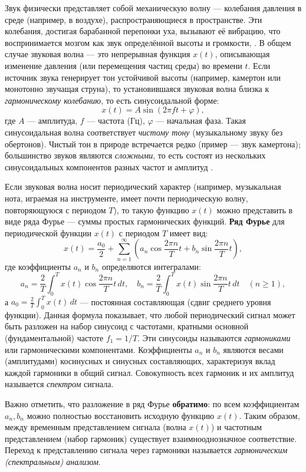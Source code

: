 \documentclass[bachelor, och, diploma]{SCWorks}
\begin{document}
Звук физически представляет собой механическую волну --- колебания давления в среде (например, в воздухе), распространяющиеся в пространстве. Эти колебания, достигая барабанной перепонки уха, вызывают её вибрацию, что воспринимается мозгом как звук определённой высоты и громкости\cite{fletcher}, \cite{rossing}. В общем случае звуковая волна --- это непрерывная функция $x(t)$, описывающая изменение давления (или перемещения частиц среды) во времени $t$. Если источник звука генерирует тон устойчивой высоты (например, камертон или монотонно звучащая струна), то установившаяся звуковая волна близка к \textit{гармоническому колебанию}, то есть синусоидальной форме:
\[
x(t) = A \sin(2\pi f t + \varphi),
\]
где $A$ --- амплитуда, $f$ --- частота (Гц), $\varphi$ --- начальная фаза. Такая синусоидальная волна соответствует \textit{чистому тону} (музыкальному звуку без обертонов). Чистый тон в природе встречается редко (пример --- звук камертона); большинство звуков являются \textit{сложными}, то есть состоят из нескольких синусоидальных компонентов разных частот и амплитуд \cite{fletcher}.

Если звуковая волна носит периодический характер (например, музыкальная нота, играемая на инструменте, имеет почти периодическую волну, повторяющуюся с периодом $T$), то такую функцию $x(t)$ можно представить в виде ряда Фурье --- суммы простых гармонических функций. \textbf{Ряд Фурье} для периодической функции $x(t)$ с периодом $T$ имеет вид\cite{opp-dsp}:
\[
x(t) = \frac{a_0}{2} + \sum_{n=1}^{\infty} \left( a_n \cos \frac{2\pi n}{T}t + b_n \sin \frac{2\pi n}{T}t \right),
\]
где коэффициенты $a_n$ и $b_n$ определяются интегралами:
\[
a_n = \frac{2}{T} \int_{0}^{T} x(t)\cos\frac{2\pi n}{T}t\,dt, \quad 
b_n = \frac{2}{T} \int_{0}^{T} x(t)\sin\frac{2\pi n}{T}t\,dt \quad (n \ge 1),
\]
а $a_0 = \frac{2}{T} \int_{0}^{T} x(t)\,dt$ --- постоянная составляющая (сдвиг среднего уровня функции). Данная формула показывает, что любой периодический сигнал может быть разложен на набор синусоид с частотами, кратными основной (фундаментальной) частоте $f_1 = 1/T$. Эти синусоиды называются \textit{гармониками} или гармоническими компонентами. Коэффициенты $a_n$ и $b_n$ являются весами (амплитудами) косинусных и синусных составляющих, характеризуя вклад каждой гармоники в общий сигнал. Совокупность всех гармоник и их амплитуд называется \textit{спектром} сигнала.

Важно отметить, что разложение в ряд Фурье \textbf{обратимо}: по всем коэффициентам $a_n, b_n$ можно полностью восстановить исходную функцию $x(t)$\cite{opp-dsp}. Таким образом, между временным представлением сигнала (волна $x(t)$) и частотным представлением (набор гармоник) существует взаимнооднозначное соответствие. Переход к представлению сигнала через гармоники называется \textit{гармоническим (спектральным) анализом}.
\end{document}
